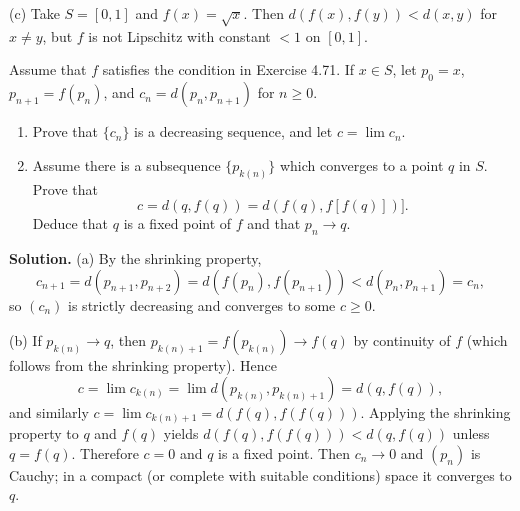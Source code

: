 (c) Take $S=[0,1]$ and $f(x)=\sqrt{x}$. Then $d(f(x),f(y))<d(x,y)$ for $x\ne y$, but $f$ is not Lipschitz with constant $<1$ on $[0,1]$.
\medskip

\begin{problembox}
Assume that $f$ satisfies the condition in Exercise 4.71. If $x \in S$, let $p_0 = x$, $p_{n+1} = f(p_n)$, and $c_n = d(p_n, p_{n+1})$ for $n \geq 0$.
\begin{enumerate}[label=(\alph*)]
\item Prove that $\{c_n\}$ is a decreasing sequence, and let $c = \lim c_n$.
\item Assume there is a subsequence $\{p_{k(n)}\}$ which converges to a point $q$ in $S$. Prove that
\[c = d(q, f(q)) = d(f(q), f[f(q)])].\]
Deduce that $q$ is a fixed point of $f$ and that $p_n \to q$.
\end{enumerate}
\end{problembox}

\noindent\textbf{Solution.}
(a) By the shrinking property,
\[
c_{n+1}=d(p_{n+1},p_{n+2})=d(f(p_n),f(p_{n+1}))<d(p_n,p_{n+1})=c_n,
\]
so $(c_n)$ is strictly decreasing and converges to some $c\ge 0$.

(b) If $p_{k(n)}\to q$, then $p_{k(n)+1}=f(p_{k(n)})\to f(q)$ by continuity of $f$ (which follows from the shrinking property). Hence
\[
c=\lim c_{k(n)}=\lim d(p_{k(n)},p_{k(n)+1})=d(q,f(q)),
\]
and similarly $c=\lim c_{k(n)+1}=d(f(q),f(f(q)))$. Applying the shrinking property to $q$ and $f(q)$ yields $d(f(q),f(f(q)))<d(q,f(q))$ unless $q=f(q)$. Therefore $c=0$ and $q$ is a fixed point. Then $c_n\to 0$ and $(p_n)$ is Cauchy; in a compact (or complete with suitable conditions) space it converges to $q$.
